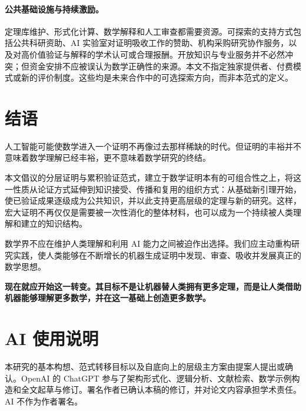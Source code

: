 \documentclass[UTF8,11pt,a4paper,fontset=fandol]{ctexart}
\theoremstyle{definition}\newtheorem{definition}{定义}
\begin{document}
\paragraph{公共基础设施与持续激励。} 定理库维护、形式化计算、数学解释和人工审查都需要资源。可探索的支持方式包括公共科研资助、AI 实验室对证明吸收工作的赞助、机构采购研究协作服务，以及对高价值验证与解释的学术认可或合理报酬。开放知识与专业服务并不必然冲突；但资金安排不应被误认为数学正确性的来源。本文不指定独家提供者、付费模式或新的评价制度。这些均是未来合作中的可选探索方向，而非本范式的定义。

\section{结语}
人工智能可能使数学进入一个证明不再像过去那样稀缺的时代。但证明的丰裕并不意味着数学理解已经丰裕，更不意味着数学研究的终结。

本文倡议的分层证明与累积验证范式，建立于数学证明本有的可组合性之上，将这一性质从论证方式延伸到知识接受、传播和复用的组织方式：从基础新引理开始，使已验证成果逐级成为公共知识，并以此支持更高层级的定理与新的研究。这样，宏大证明不再仅仅是需要被一次性消化的整体材料，也可以成为一个持续被人类理解和建立的知识结构。

数学界不应在维护人类理解和利用 AI 能力之间被迫作出选择。我们应主动重构研究实践，使人类能够在不断增长的机器生成证明中发现、审查、吸收并发展真正的数学思想。

\textbf{现在就应开始这一转变。其目标不是让机器替人类拥有更多定理，而是让人类借助机器能够理解更多数学，并在这一基础上创造更多数学。}

\section*{AI 使用说明}
本研究的基本构想、范式转移目标以及自底向上的层级主方案由提案人提出或确认。OpenAI 的 ChatGPT 参与了架构形式化、逻辑分析、文献检索、数学示例构造和全文起草与修订。署名作者已确认本稿的修订，并对论文内容承担学术责任。AI 不作为作者署名。
\end{document}
